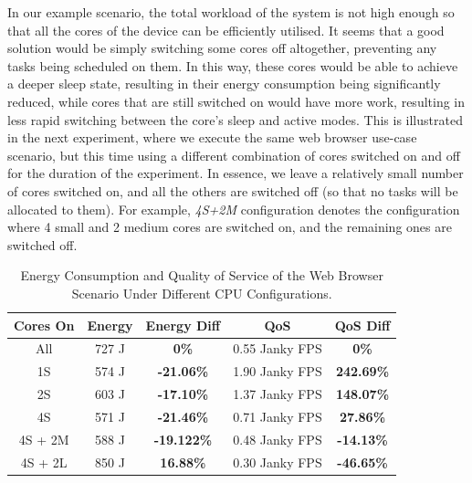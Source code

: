 \documentclass[conference]{IEEEtran}
\begin{document}
In our example scenario, the total workload of the system is not high enough so that all the cores of the device can be efficiently utilised. It seems that a good solution would be simply switching some cores off altogether, preventing any tasks being scheduled on them. In this way, these cores would be able to achieve a deeper sleep state, resulting in their energy consumption being significantly reduced, while cores that are still switched on would have more work, resulting in less rapid switching between the core's sleep and active modes.
This is illustrated in the next experiment, where we execute the same web browser use-case scenario, but this time using a different combination of cores switched on and off for the duration of the experiment. In essence, we leave a relatively small number of cores switched on, and all the others are switched off (so that no tasks will be allocated to them). For example, \emph{4S+2M} configuration denotes the configuration where 4 small and 2 medium cores are switched on, and the remaining ones are switched off.

\begin{table}
\renewcommand{\arraystretch}{1.3}
\caption{Energy Consumption and Quality of Service of the Web Browser Scenario Under Different CPU Configurations.}
\label{tab:energyweb}
\centering
\begin{tabular}{|c|c|c|c|c|}
\hline
\textbf{Cores On} & \textbf{Energy} & \textbf{Energy Diff} &  \textbf{QoS} & \textbf{QoS Diff} \\
\hline
      All &  727 J &     \textbf{0\%}  & 0.55 Janky FPS & \textbf{0\%} \\ 
      1S & 574 J & \textbf{-21.06\%} & 1.90 Janky FPS & \textbf{242.69\%} \\
      2S & 603 J & \textbf{-17.10\%} & 1.37 Janky FPS & \textbf{148.07\%} \\
      4S & 571 J & \textbf{-21.46\%} & 0.71 Janky FPS & \textbf{27.86\%} \\
      4S + 2M & 588 J & \textbf{-19.122\%} & 0.48 Janky FPS & \textbf{-14.13\%}\\
      4S + 2L & 850 J &  \textbf{16.88\%} & 0.30 Janky FPS & \textbf{-46.65\%}\\
      
      \hline
\end{tabular}
\end{table}
\end{document}

